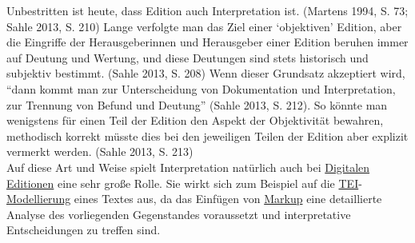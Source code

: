 \documentclass{article}
\begin{document}
        Unbestritten ist heute, dass Edition auch Interpretation ist. (Martens 1994, S. 73; Sahle 2013, S. 210) Lange verfolgte man das Ziel einer ‘objektiven’ Edition, aber die Eingriffe der Herausgeberinnen und Herausgeber einer Edition beruhen immer auf Deutung und Wertung, und diese Deutungen sind stets historisch und subjektiv bestimmt. (Sahle 2013, S. 208) Wenn dieser Grundsatz akzeptiert wird, “dann kommt man zur Unterscheidung von Dokumentation und Interpretation, zur Trennung von Befund und Deutung” (Sahle 2013, S. 212). So könnte man wenigstens für einen Teil der Edition den Aspekt der Objektivität bewahren, methodisch korrekt müsste dies bei den jeweiligen Teilen der Edition aber explizit vermerkt werden. (Sahle 2013, S. 213)\\
            
        Auf diese Art und Weise spielt Interpretation natürlich auch bei \href{http://gams.uni-graz.at/o:konde.59}{Digitalen Editionen} eine sehr große Rolle. Sie wirkt sich zum Beispiel auf die \href{http://gams.uni-graz.at/o:konde.178}{TEI}-\href{http://gams.uni-graz.at/o:konde.137}{Modellierung} eines Textes aus, da das Einfügen von \href{http://gams.uni-graz.at/o:konde.126}{Markup} eine detaillierte Analyse des vorliegenden Gegenstandes voraussetzt und interpretative Entscheidungen zu treffen sind.\\
            
\end{document}
